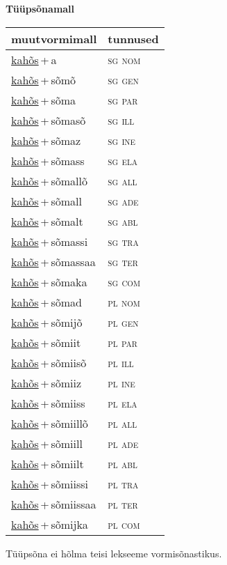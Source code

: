 
\vspace{1.8em}
\begin{minipage}{\textwidth}
\textbf{Tüüpsõnamall \,}\\

\begin{sideways}
\begin{tabular}{l l}
muutvormimall & tunnused \\
\hline
\underline{kahõs}\,+\,a & \textsc{ sg nom } \\
\underline{kahõs}\,+\,sõmõ & \textsc{ sg gen } \\
\underline{kahõs}\,+\,sõma & \textsc{ sg par } \\
\underline{kahõs}\,+\,sõmasõ & \textsc{ sg ill } \\
\underline{kahõs}\,+\,sõmaz & \textsc{ sg ine } \\
\underline{kahõs}\,+\,sõmass & \textsc{ sg ela } \\
\underline{kahõs}\,+\,sõmallõ & \textsc{ sg all } \\
\underline{kahõs}\,+\,sõmall & \textsc{ sg ade } \\
\underline{kahõs}\,+\,sõmalt & \textsc{ sg abl } \\
\underline{kahõs}\,+\,sõmassi & \textsc{ sg tra } \\
\underline{kahõs}\,+\,sõmassaa & \textsc{ sg ter } \\
\underline{kahõs}\,+\,sõmaka & \textsc{ sg com } \\
\underline{kahõs}\,+\,sõmad & \textsc{ pl nom } \\
\underline{kahõs}\,+\,sõmijõ & \textsc{ pl gen } \\
\underline{kahõs}\,+\,sõmiit & \textsc{ pl par } \\
\underline{kahõs}\,+\,sõmiisõ & \textsc{ pl ill } \\
\underline{kahõs}\,+\,sõmiiz & \textsc{ pl ine } \\
\underline{kahõs}\,+\,sõmiiss & \textsc{ pl ela } \\
\underline{kahõs}\,+\,sõmiillõ & \textsc{ pl all } \\
\underline{kahõs}\,+\,sõmiill & \textsc{ pl ade } \\
\underline{kahõs}\,+\,sõmiilt & \textsc{ pl abl } \\
\underline{kahõs}\,+\,sõmiissi & \textsc{ pl tra } \\
\underline{kahõs}\,+\,sõmiissaa & \textsc{ pl ter } \\
\underline{kahõs}\,+\,sõmijka & \textsc{ pl com } \\
\end{tabular}
\end{sideways}
\label{tab:tüüpsõnamall-kahõsa}

\end{minipage}

 
\vspace{1em}
\noindent Tüüpsõna ei hõlma teisi lekseeme vormi\-sõnastikus.
